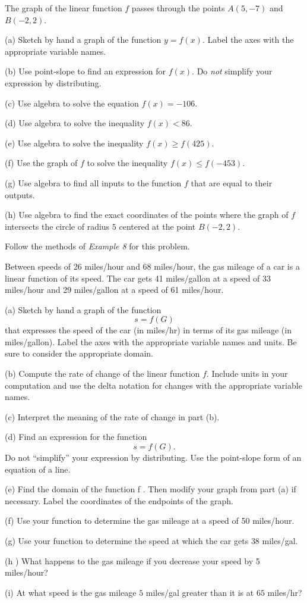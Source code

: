 \documentclass{ximera}
\begin{document}
\begin{question}  \label{Qdfg54t54t}
The graph of the linear function $f$ passes through the points $A(5,-7)$ and $B(-2,2)$.

(a) Sketch by hand a graph of the function $y=f(x)$. Label the axes with the appropriate variable names.

(b) Use point-slope to find an expression for $f(x)$. Do \emph{not} simplify your expression by distributing.

(c) Use algebra to solve the equation $f(x) = -106$.

(d) Use algebra to solve the inequality $f(x) < 86$.

(e) Use algebra to solve the inequality $f(x) \geq f(425)$.

(f) Use the graph of $f$ to solve the inequality $f(x)\leq f(-453)$.

(g) Use algebra to find all inputs to the function $f$ that are equal to their outputs.

(h) Use algebra to find the exact coordinates of the points where the graph of $f$ intersects the circle of radius $5$ centered at the point $B(-2,2)$.

\end{question}


\begin{question}  \label{Q324fggg}
Follow the methods of \emph{Example 8} for this problem.

Between speeds of 26 miles/hour and 68 miles/hour, the gas mileage of a car is a linear function of its speed. The car gets 41 miles/gallon at a speed of 33 miles/hour and 29 miles/gallon at a speed of 61 miles/hour.

(a) Sketch by hand a graph of the function 
\[
      s = f (G)
\]
that expresses the speed of the car (in miles/hr) in terms of its gas mileage (in miles/gallon). Label the axes with the appropriate variable names and units. Be sure to consider the appropriate domain.

(b) Compute the rate of change of the linear function $f$. Include units in your computation and use the delta notation for changes with the appropriate variable names. 

(c)  Interpret the meaning of the rate of change in part (b). 

(d) Find an expression for the function 
\[
   s = f (G). 
\]
Do not “simplify” your expression by distributing. Use the point-slope form of an equation of a line.

(e) Find the domain of the function f . Then modify your graph from part (a) if necessary. Label the coordinates of the endpoints of the graph.


(f) Use your function to determine the gas mileage at a speed of 50 miles/hour.

(g) Use  your function to determine the speed at which the car gets $38$ miles/gal.

(h ) What happens to the gas mileage if you decrease your speed by 5 miles/hour?

(i) At what speed is the gas mileage $5$ miles/gal greater than it is at $65$ miles/hr?


\end{question}
\end{document}
